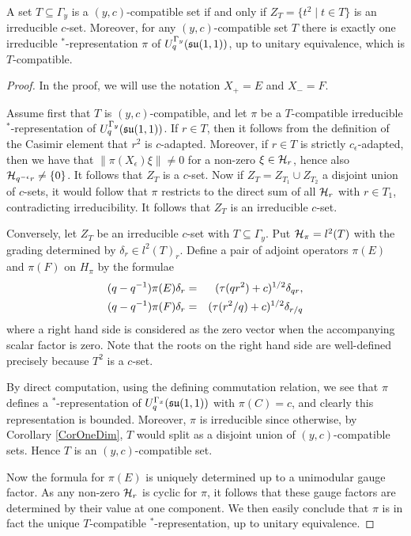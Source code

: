 \begin{Prop}\label{PropClassRep} A set $T\subseteq \Gamma_y$ is a $(y,c)$-compatible set if and only if $Z_T = \{t^2\mid t\in T\}$ is an irreducible $c$-set. Moreover, for any $(y,c)$-compatible set $T$ there is exactly one irreducible $^*$-representation $\pi$ of $U_q^{\Gamma_y}(\mathfrak{su}(1,1))$, up to unitary equivalence, which is $T$-compatible.
\end{Prop}

\begin{proof} In the proof, we will use the notation $X_+ = E$ and $X_- = F$.

Assume first that $T$ is $(y,c)$-compatible, and let $\pi$ be a $T$-compatible irreducible $^*$-representation of $U_q^{\Gamma_y}(\mathfrak{su}(1,1))$. If $r\in T$, then it follows from the definition of the Casimir element that $r^2$ is $c$-adapted. Moreover, if $r\in T$ is strictly $c_{\epsilon}$-adapted, then we have that $\|\pi(X_{\epsilon})\xi\|\neq 0$ for a non-zero $\xi\in \mathcal{H}_r$, hence also $\mathcal{H}_{q^{-\epsilon}r}\neq \{0\}$. It follows that $Z_T$ is a $c$-set. Now if $Z_T=Z_{T_1}\cup Z_{T_2}$ a disjoint union of $c$-sets, it would follow that $\pi$ restricts to the direct sum of all $\mathcal{H}_r$ with $r\in T_1$, contradicting irreducibility. It follows that $Z_T$ is an irreducible $c$-set.

Conversely, let $Z_T$ be an irreducible $c$-set with $T\subseteq \Gamma_y$. Put $\mathcal{H}_{\pi} = l^2(T)$ with the grading determined by $\delta_{r}\in l^2(T)_r$. Define a pair of adjoint operators $\pi(E)$ and $\pi(F)$ on $H_{\pi}$ by the formulae \begin{eqnarray}\label{EqFormRepPlus} (q-q^{-1})\pi(E)  \delta_{r} &=&  (\operatorname{\tau}(qr^2)+c)^{1/2}\delta_{qr},\\ (q-q^{-1})\pi(F)  \delta_{r} &=&  (\operatorname{\tau}(r^2/q)+c)^{1/2}\delta_{r/q} \end{eqnarray} where a right hand side is considered as the zero vector when the accompanying scalar factor is zero. Note that the roots on the right hand side are well-defined precisely because $T^2$ is a $c$-set. 

By direct computation, using the defining commutation relation, we see that $\pi$ defines a $^*$-representation of $U_q^{\Gamma_x}(\mathfrak{su}(1,1))$ with $\pi(C) =c$, and clearly this representation is bounded. Moreover, $\pi$ is irreducible since otherwise, by Corollary \ref{CorOneDim}, $T$ would split as a disjoint union of $(y,c)$-compatible sets. Hence $T$ is an $(y,c)$-compatible set.

Now the formula for $\pi(E)$ is uniquely determined up to a unimodular gauge factor. As any non-zero $\mathcal{H}_r$ is cyclic for $\pi$, it follows that these gauge factors are determined by their value at one component. We then easily conclude that $\pi$ is in fact the unique $T$-compatible $^*$-representation, up to unitary equivalence.
\end{proof}

